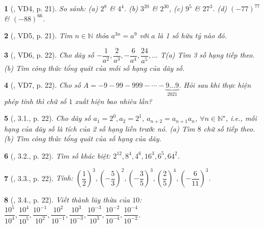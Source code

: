 \documentclass{article}
\newtheorem{baitoan}{}
\begin{document}
\begin{baitoan}[\cite{Binh_boi_duong_Toan_7_tap_1}, VD4, p. 21]
	So sánh: (a) $2^8$ \& $4^4$. (b) $3^{20}$ \& $2^{30}$, (c) $9^5$ \& $27^3$. (d) $(-77)^{77}$ \& $(-88)^{66}$.
\end{baitoan}

\begin{baitoan}[\cite{Binh_boi_duong_Toan_7_tap_1}, VD5, p. 21]
	Tìm $n\in\mathbb{N}$ thỏa $a^{3n} = a^9$ với $a$ là 1 số hữu tỷ nào đó.
\end{baitoan}

\begin{baitoan}[\cite{Binh_boi_duong_Toan_7_tap_1}, VD6, p. 22]
	Cho dãy số $-\dfrac{1}{a^2},\dfrac{2}{a^3},-\dfrac{6}{a^4},\dfrac{24}{a^5},\ldots$ T(a) Tìm 3 số hạng tiếp theo. (b) Tìm công thức tổng quát của mỗi số hạng của dãy số.
\end{baitoan}

\begin{baitoan}[\cite{Binh_boi_duong_Toan_7_tap_1}, VD7, p. 22]
	Cho số $A = -9 - 99 - 999 - \cdots - \underbrace{9\ldots9}_{2021}$. Hỏi sau khi thực hiện phép tính thì chữ số $1$ xuất hiện bao nhiêu lần?
\end{baitoan}

\begin{baitoan}[\cite{Binh_boi_duong_Toan_7_tap_1}, 3.1., p. 22]
	Cho dãy số $a_1 = 2^0,a_2 = 2^1$, $a_{n + 2} = a_{n + 1}a_n$, $\forall n\in\mathbb{N}^\star$, i.e., mỗi hạng của dãy số là tích của 2 số hạng liền trước nó. (a) Tìm $8$ chữ số tiếp theo. (b) Tìm công thức tổng quát của số hạng của dãy.
\end{baitoan}

\begin{baitoan}[\cite{Binh_boi_duong_Toan_7_tap_1}, 3.2., p. 22]
	Tìm số khác biệt: $2^{12},8^4,4^6,16^3,6^5,64^2$.
\end{baitoan}

\begin{baitoan}[\cite{Binh_boi_duong_Toan_7_tap_1}, 3.3., p. 22]
	Tính: $\left(\dfrac{1}{2}\right)^3,\left(-\dfrac{5}{3}\right)^2,\left(-\dfrac{3}{5}\right)^3,\left(\dfrac{2}{5}\right)^4,\left(-\dfrac{6}{11}\right)^3$.
\end{baitoan}

\begin{baitoan}[\cite{Binh_boi_duong_Toan_7_tap_1}, 3.4., p. 22]
	Viết thành lũy thừa của $10$: $\dfrac{10^5}{10^4},\dfrac{10^4}{10^5},\dfrac{10^{-1}}{10^2},\dfrac{10^2}{10^{-1}},\dfrac{10^3}{10^{-3}},\dfrac{10^{-3}}{10^3},\dfrac{10^{-2}}{10^{-4}},\dfrac{10^{-4}}{10^{-2}}$.
\end{baitoan}
\end{document}

